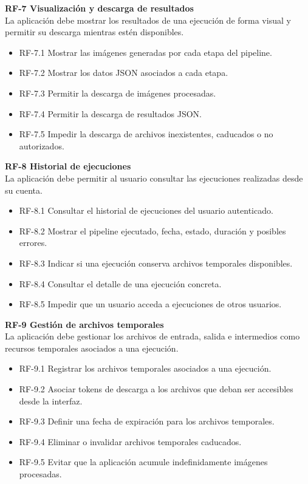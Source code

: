 \textbf{RF-7 Visualización y descarga de resultados}\\
La aplicación debe mostrar los resultados de una ejecución de forma visual y permitir su descarga mientras estén disponibles.

\begin{itemize}
	\item RF-7.1 Mostrar las imágenes generadas por cada etapa del pipeline.
	\item RF-7.2 Mostrar los datos JSON asociados a cada etapa.
	\item RF-7.3 Permitir la descarga de imágenes procesadas.
	\item RF-7.4 Permitir la descarga de resultados JSON.
	\item RF-7.5 Impedir la descarga de archivos inexistentes, caducados o no autorizados.
\end{itemize}

\textbf{RF-8 Historial de ejecuciones}\\
La aplicación debe permitir al usuario consultar las ejecuciones realizadas desde su cuenta.

\begin{itemize}
	\item RF-8.1 Consultar el historial de ejecuciones del usuario autenticado.
	\item RF-8.2 Mostrar el pipeline ejecutado, fecha, estado, duración y posibles errores.
	\item RF-8.3 Indicar si una ejecución conserva archivos temporales disponibles.
	\item RF-8.4 Consultar el detalle de una ejecución concreta.
	\item RF-8.5 Impedir que un usuario acceda a ejecuciones de otros usuarios.
\end{itemize}

\textbf{RF-9 Gestión de archivos temporales}\\
La aplicación debe gestionar los archivos de entrada, salida e intermedios como recursos temporales asociados a una ejecución.

\begin{itemize}
	\item RF-9.1 Registrar los archivos temporales asociados a una ejecución.
	\item RF-9.2 Asociar tokens de descarga a los archivos que deban ser accesibles desde la interfaz.
	\item RF-9.3 Definir una fecha de expiración para los archivos temporales.
	\item RF-9.4 Eliminar o invalidar archivos temporales caducados.
	\item RF-9.5 Evitar que la aplicación acumule indefinidamente imágenes procesadas.
\end{itemize}

